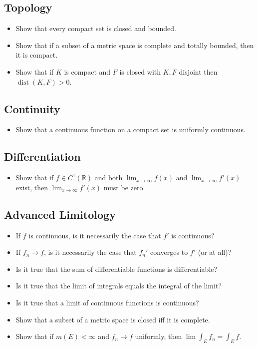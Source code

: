 \hypertarget{topology}{%
\subsection{Topology}\label{topology}}

\begin{itemize}
\tightlist
\item
  Show that every compact set is closed and bounded.
\item
  Show that if a subset of a metric space is complete and totally
  bounded, then it is compact.
\item
  Show that if \(K\) is compact and \(F\) is closed with \(K, F\)
  disjoint then \(\operatorname{dist}(K, F) > 0\).
\end{itemize}

\hypertarget{continuity}{%
\subsection{Continuity}\label{continuity}}

\begin{itemize}
\tightlist
\item
  Show that a continuous function on a compact set is uniformly
  continuous.
\end{itemize}

\hypertarget{differentiation}{%
\subsection{Differentiation}\label{differentiation}}

\begin{itemize}
\tightlist
\item
  Show that if \(f\in C^1({\mathbb{R}})\) and both
  \(\lim_{x\to \infty} f(x)\) and \(\lim_{x\to \infty} f'(x)\) exist,
  then \(\lim_{x\to\infty} f'(x)\) must be zero.
\end{itemize}

\hypertarget{advanced-limitology}{%
\subsection{Advanced Limitology}\label{advanced-limitology}}

\begin{itemize}
\tightlist
\item
  If \(f\) is continuous, is it necessarily the case that \(f'\) is
  continuous?
\item
  If \(f_n \to f\), is it necessarily the case that \(f_n'\) converges
  to \(f'\) (or at all)?
\item
  Is it true that the sum of differentiable functions is differentiable?
\item
  Is it true that the limit of integrals equals the integral of the
  limit?
\item
  Is it true that a limit of continuous functions is continuous?
\item
  Show that a subset of a metric space is closed iff it is complete.
\item
  Show that if \(m(E) < \infty\) and \(f_n\to f\) uniformly, then
  \(\lim \int_E f_n = \int_E f\).
\end{itemize}

